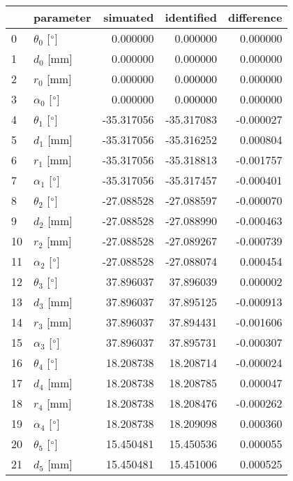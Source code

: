\documentclass{standalone}%
\begin{document}
%
\normalsize%
\begin{tabular}{llrrr}
\toprule
{} &                 parameter &   simuated & identified & difference \\
\midrule
0  &  $\theta_{0}$ [$\degree$] &   0.000000 &   0.000000 &   0.000000 \\
1  &              $d_{0}$ [mm] &   0.000000 &   0.000000 &   0.000000 \\
2  &              $r_{0}$ [mm] &   0.000000 &   0.000000 &   0.000000 \\
3  &  $\alpha_{0}$ [$\degree$] &   0.000000 &   0.000000 &   0.000000 \\
4  &  $\theta_{1}$ [$\degree$] & -35.317056 & -35.317083 &  -0.000027 \\
5  &              $d_{1}$ [mm] & -35.317056 & -35.316252 &   0.000804 \\
6  &              $r_{1}$ [mm] & -35.317056 & -35.318813 &  -0.001757 \\
7  &  $\alpha_{1}$ [$\degree$] & -35.317056 & -35.317457 &  -0.000401 \\
8  &  $\theta_{2}$ [$\degree$] & -27.088528 & -27.088597 &  -0.000070 \\
9  &              $d_{2}$ [mm] & -27.088528 & -27.088990 &  -0.000463 \\
10 &              $r_{2}$ [mm] & -27.088528 & -27.089267 &  -0.000739 \\
11 &  $\alpha_{2}$ [$\degree$] & -27.088528 & -27.088074 &   0.000454 \\
12 &  $\theta_{3}$ [$\degree$] &  37.896037 &  37.896039 &   0.000002 \\
13 &              $d_{3}$ [mm] &  37.896037 &  37.895125 &  -0.000913 \\
14 &              $r_{3}$ [mm] &  37.896037 &  37.894431 &  -0.001606 \\
15 &  $\alpha_{3}$ [$\degree$] &  37.896037 &  37.895731 &  -0.000307 \\
16 &  $\theta_{4}$ [$\degree$] &  18.208738 &  18.208714 &  -0.000024 \\
17 &              $d_{4}$ [mm] &  18.208738 &  18.208785 &   0.000047 \\
18 &              $r_{4}$ [mm] &  18.208738 &  18.208476 &  -0.000262 \\
19 &  $\alpha_{4}$ [$\degree$] &  18.208738 &  18.209098 &   0.000360 \\
20 &  $\theta_{5}$ [$\degree$] &  15.450481 &  15.450536 &   0.000055 \\
21 &              $d_{5}$ [mm] &  15.450481 &  15.451006 &   0.000525 \\

\end{tabular}
\end{document}

